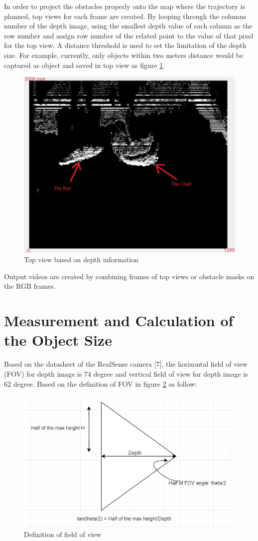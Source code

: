 \documentclass[
  oneside]{ubcthesis}
\begin{document}
In order to project the obstacles properly onto the map where the trajectory is planned, top views for each frame are created. By looping through the columns number of the depth image, using the smallest depth value of each column as the row number and assign row number of the related point to the value of that pixel for the top view. A distance threshold is used to set the limitation of the depth size. For example, currently, only objects within two meters distance would be captured as object and saved in top view as figure \ref{fig:figure4}.

\begin{figure}

{\centering \includegraphics[width=0.3\linewidth]{figures/4} 

}

\caption{Top view based on depth information}\label{fig:figure4}
\end{figure}



Output videos are created by combining frames of top views or obstacle masks on the RGB frames.

\hypertarget{measurement-and-calculation-of-the-object-size}{%
\section{Measurement and Calculation of the Object Size}\label{measurement-and-calculation-of-the-object-size}}

Based on the datasheet of the RealSense camera {[}7{]}, the horizontal field of view (FOV) for depth image is 74 degree and vertical field of view for depth image is 62 degree. Based on the definition of FOV in figure \ref{fig:figure5} as follow:

\begin{figure}

{\centering \includegraphics[width=0.6\linewidth]{figures/5} 

}

\caption{Definition of field of view}\label{fig:figure5}
\end{figure}
\end{document}
